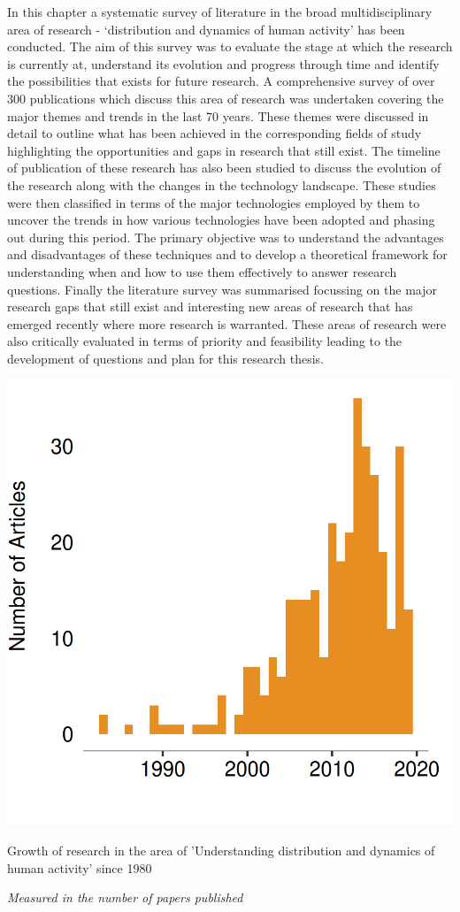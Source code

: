 In this chapter a systematic survey of literature in the broad multidisciplinary area of research - `distribution and dynamics of human activity' has been conducted.
The aim of this survey was to evaluate the stage at which the research is currently at, understand its evolution and progress through time and identify the possibilities that exists for future research.
A comprehensive survey of over 300 publications which discuss this area of research was undertaken covering the major themes and trends in the last 70 years.
These themes were discussed in detail to outline what has been achieved in the corresponding fields of study highlighting the opportunities and gaps in research that still exist.
The timeline of publication of these research has also been studied to discuss the evolution of the research along with the changes in the technology landscape.
These studies were then classified in terms of the major technologies employed by them to uncover the trends in how various technologies have been adopted and phasing out during this period.
The primary objective was to understand the advantages and disadvantages of these techniques and to develop a theoretical framework for understanding when and how to use them effectively to answer research questions.
Finally the literature survey was summarised focussing on the major research gaps that still exist and interesting new areas of research that has emerged recently  where more research is warranted.
These areas of research were also critically evaluated in terms of priority and feasibility leading to the development of questions and plan for this research thesis. 

\begin{marginfigure}
  \includegraphics{images/literature-timeline.png}
  \caption{Growth of research in the area of 'Understanding distribution and dynamics of human activity' since 1980}
  \label{figure:literature:timeline}
  \vspace{1em}
  \noindent\fontsize{7}{7}\textit{Measured in the number of papers published}
\end{marginfigure}

